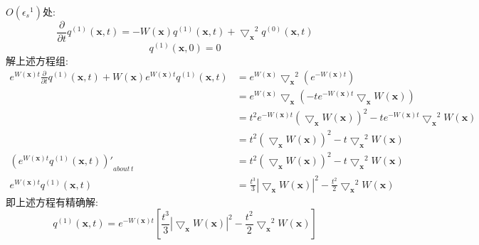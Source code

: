 $O({\epsilon_s}^1)$处:
\begin{equation}
\frac{\partial}{\partial t}q^{(1)}(\mathbf{x},t) = -W(\mathbf{x}) q^{(1)}(\mathbf{x},t)+{\bigtriangledown_{\mathbf{x}}}^2 q^{(0)}(\mathbf{x},t)
\end{equation}
\begin{equation}
q^{(1)}(\mathbf{x},0) = 0
\end{equation}
解上述方程组:
$$
\begin{aligned}
e^{W(\mathbf{x})t}\frac{\partial}{\partial t}q^{(1)}(\mathbf{x},t)+W(\mathbf{x})e^{W(\mathbf{x})t}q^{(1)}(\mathbf{x},t) &= e^{W(\mathbf{x})} {\bigtriangledown_{\mathbf{x}}}^2 (e^{-W(\mathbf{x})t})\\
&= e^{W(\mathbf{x})} \bigtriangledown_{\mathbf{x}}(-t e^{-W(\mathbf{x})t} \bigtriangledown_{\mathbf{x}} W(\mathbf{x}))\\
&= t^2 e^{-W(\mathbf{x})t} (\bigtriangledown_{\mathbf{x}} W(\mathbf{x}))^2 - t e^{-W(\mathbf{x})t} {\bigtriangledown_{\mathbf{x}}}^2 W(\mathbf{x})\\
&= t^2 (\bigtriangledown_{\mathbf{x}} W(\mathbf{x}))^2-t {\bigtriangledown_{\mathbf{x}}}^2 W(\mathbf{x})\\
{(e^{W(\mathbf{x})t} q^{(1)}(\mathbf{x},t))'}_{about \, t} &= t^2 (\bigtriangledown_{\mathbf{x}} W(\mathbf{x}))^2-t {\bigtriangledown_{\mathbf{x}}}^2 W(\mathbf{x})\\
e^{W(\mathbf{x})t} q^{(1)}(\mathbf{x},t) &= \frac{t^3}{3}|\bigtriangledown_{\mathbf{x}} W(\mathbf{x})|^2 - \frac{t^2}{2} {\bigtriangledown_{\mathbf{x}}}^2 W(\mathbf{x})
\end{aligned}
$$
即上述方程有精确解:
\begin{equation}
q^{(1)}(\mathbf{x},t) = e^{-W(\mathbf{x})t} [\frac{t^3}{3}|\bigtriangledown_{\mathbf{x}} W(\mathbf{x})|^2 - \frac{t^2}{2} {\bigtriangledown_{\mathbf{x}}}^2 W(\mathbf{x})]
\end{equation}

